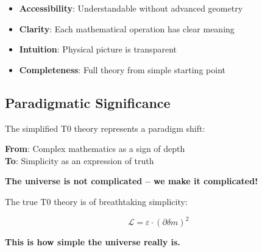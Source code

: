 \documentclass[12pt,a4paper]{article}
\newcommand{\deltam}{\delta m}
\newcommand{\Lag}{\mathcal{L}}
\theoremstyle{definition}
\theoremstyle{remark}
\begin{document}
	\begin{itemize}
		\item \textbf{Accessibility}: Understandable without advanced geometry
		\item \textbf{Clarity}: Each mathematical operation has clear meaning
		\item \textbf{Intuition}: Physical picture is transparent
		\item \textbf{Completeness}: Full theory from simple starting point
	\end{itemize}
	
	\subsection{Paradigmatic Significance}
	
	\begin{tcolorbox}[colback=red!5!white,colframe=red!75!black,title=Paradigmatic Shift]
		The simplified T0 theory represents a paradigm shift:
		
		\textbf{From}: Complex mathematics as a sign of depth \\
		\textbf{To}: Simplicity as an expression of truth
		
		\textbf{The universe is not complicated -- we make it complicated!}
	\end{tcolorbox}
	
	The true T0 theory is of breathtaking simplicity:
	
	\begin{equation}
		\boxed{\Lag = \varepsilon \cdot (\partial \deltam)^2}
	\end{equation}
	
	\textbf{This is how simple the universe really is.}
	
\end{document}
